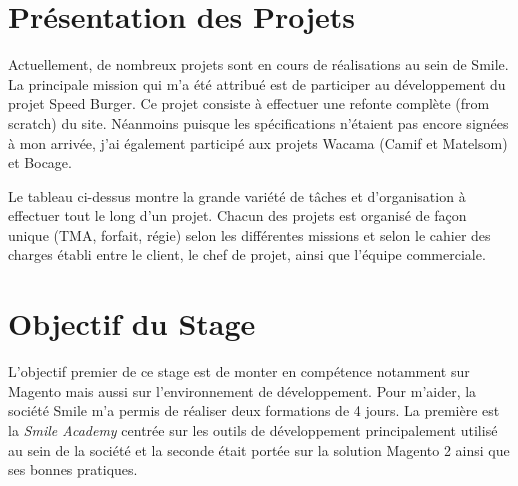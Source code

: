 \documentclass[12pt, a4paper, twoside]{report}
\begin{document}
\section{Présentation des Projets}

 Actuellement, de nombreux projets sont en cours de réalisations au sein de Smile. La principale mission qui m'a été attribué est de participer au développement du projet Speed Burger. Ce projet consiste à effectuer une refonte complète (from scratch) du site. Néanmoins puisque les spécifications n'étaient pas encore signées à mon arrivée, j'ai également participé aux projets Wacama (Camif et Matelsom) et Bocage. \\
 
 \begin{table}[H]
 	\centering
 \caption{ Tableau récapitulatif des objectifs principaux pour chaque projet auquel j'ai participé.}
 \end{table}

Le tableau ci-dessus montre la grande variété de tâches et d'organisation à effectuer tout le long d'un projet. Chacun des projets est organisé de façon unique (TMA, forfait, régie) selon les différentes missions et selon le cahier des charges établi entre le client, le chef de projet, ainsi que l'équipe commerciale. 


\section{Objectif du Stage}

L'objectif premier de ce stage est de monter en compétence notamment sur Magento mais aussi sur l'environnement de développement. Pour m'aider, la société Smile m'a permis de réaliser deux formations de 4 jours. La première est la \textit{Smile Academy} centrée sur les outils de développement principalement utilisé au sein de la société et la seconde était portée sur la solution Magento 2 ainsi que ses bonnes pratiques. \\ 
\end{document}
